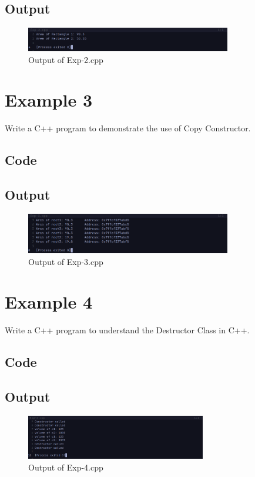 \documentclass[12pt]{article}
\begin{document}
\subsection*{Output}
\begin{figure}[htpb]
    \centering
    \includegraphics[width=0.8\textwidth]{Exp-2.png}
    \caption{Output of Exp-2.cpp}
\end{figure}


\FloatBarrier
\section*{Example 3}
Write a C++ program to demonstrate the use of Copy Constructor.

\subsection*{Code}


\subsection*{Output}
\begin{figure}[htpb]
    \centering
    \includegraphics[width=0.8\textwidth]{Exp-3.png}
    \caption{Output of Exp-3.cpp}
\end{figure}


\FloatBarrier
\section*{Example 4}
Write a C++ program to understand the Destructor Class in C++.

\subsection*{Code}


\subsection*{Output}
\begin{figure}[htpb]
    \centering
    \includegraphics[width=0.7\textwidth]{Exp-4.png}
    \caption{Output of Exp-4.cpp}
\end{figure}
\end{document}

